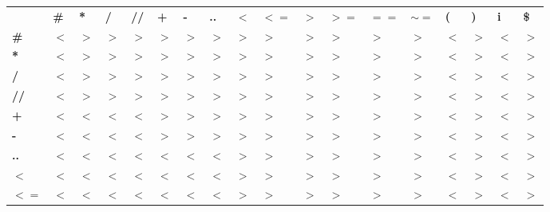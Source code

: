 \documentclass{article}
\begin{document}
    \begin{center}
        \begin{tabular}{!{\vrule width 2pt} >{}P{5.5mm} !{\vrule width 2pt} P{5.5mm} | P{5.5mm} | P{5.5mm} | P{5.5mm} | P{5.5mm} | P{5.5mm} | P{5.5mm} | P{5.5mm} | P{5.5mm} | P{5.5mm} | P{5.5mm} | P{5.5mm} | P{5.5mm} | P{5.5mm} | P{5.5mm} | P{5.5mm} | P{5.5mm} !{\vrule width 2pt}} 
            \Xhline{5\arrayrulewidth}
            & \textbf{\#} & \textbf{*} & \textbf{/} & \textbf{//} & \textbf{+} & \textbf{-} & \textbf{..} & $\bm{<}$ & $\bm{<=}$ & $\bm{>}$ & $\bm{>=}$ & $\bm{==}$ & $\bm{\sim=}$ & \textbf{(} & \textbf{)} & \textbf{i} & \textbf{\$} \\ [0.6ex]
            \Xhline{5\arrayrulewidth}
            \textbf{\#}      & $<$ & $>$ & $>$ & $>$ & $>$ & $>$ & $>$ & $>$ & $>$ & $>$ & $>$ & $>$ & $>$ & $<$ & $>$ & $<$ & $>$ \\ [0.5ex]
            \hline
            \textbf{*}       & $<$ & $>$ & $>$ & $>$ & $>$ & $>$ & $>$ & $>$ & $>$ & $>$ & $>$ & $>$ & $>$ & $<$ & $>$ & $<$ & $>$ \\ [0.5ex]
            \hline
            \textbf{/}       & $<$ & $>$ & $>$ & $>$ & $>$ & $>$ & $>$ & $>$ & $>$ & $>$ & $>$ & $>$ & $>$ & $<$ & $>$ & $<$ & $>$ \\ [0.5ex]
            \hline
            \textbf{//}      & $<$ & $>$ & $>$ & $>$ & $>$ & $>$ & $>$ & $>$ & $>$ & $>$ & $>$ & $>$ & $>$ & $<$ & $>$ & $<$ & $>$ \\ [0.5ex]
            \hline
            \textbf{+}       & $<$ & $<$ & $<$ & $<$ & $>$ & $>$ & $>$ & $>$ & $>$ & $>$ & $>$ & $>$ & $>$ & $<$ & $>$ & $<$ & $>$ \\ [0.5ex]
            \hline
            \textbf{-}       & $<$ & $<$ & $<$ & $<$ & $>$ & $>$ & $>$ & $>$ & $>$ & $>$ & $>$ & $>$ & $>$ & $<$ & $>$ & $<$ & $>$ \\ [0.5ex]
            \hline
            \textbf{..}      & $<$ & $<$ & $<$ & $<$ & $<$ & $<$ & $<$ & $>$ & $>$ & $>$ & $>$ & $>$ & $>$ & $<$ & $>$ & $<$ & $>$ \\ [0.5ex]
            \hline
            $\bm{<}$     & $<$ & $<$ & $<$ & $<$ & $<$ & $<$ & $<$ & $>$ & $>$ & $>$ & $>$ & $>$ & $>$ & $<$ & $>$ & $<$ & $>$ \\ [0.5ex]
            \hline
            $\bm{<=}$    & $<$ & $<$ & $<$ & $<$ & $<$ & $<$ & $<$ & $>$ & $>$ & $>$ & $>$ & $>$ & $>$ & $<$ & $>$ & $<$ & $>$ \\ [0.5ex]
            \hline

\end{tabular}
\end{center}
\end{document}
